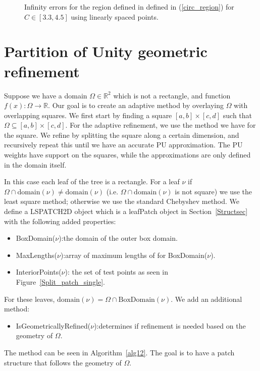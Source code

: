 \documentclass{article}
\newcommand{\R}{\mathbb{R}}
\begin{document}
\begin{figure}[!htb]
\centering
{}\hfill
{}
\label{circplotl}
\caption{Infinity errors for the region defined in  defined in (\ref{circ_region}) for $C \in [3.3,4.5]$ using linearly spaced points.}
\end{figure}

\section{Partition of Unity geometric refinement}

Suppose we have a domain $\Omega \in \R^2$ which is not a rectangle, and function $f(x):\Omega \to \R$. Our goal is to create an adaptive method by overlaying $\Omega$ with overlapping squares. We first start by finding a square $[a,b] \times [c,d]$ such that $\Omega \subseteq [a,b] \times [c,d]$. For the adaptive refinement, we use the method we have for the square. We refine by splitting the square along a certain dimension, and recursively repeat this until we have an accurate PU approximation. The PU weights have support on the squares, while the approximations are only defined in the domain itself.

In this case each leaf of the tree is a rectangle. For a leaf $\nu$ if $\Omega \cap \text{domain}(\nu) \neq \text{domain}(\nu)$ (i.e. $\Omega \cap \text{domain}(\nu)$ is not square) we use the least square method; otherwise we use the standard Chebyshev method. We define a LSPATCH2D object which is a leafPatch object in Section~\ref{Structsec} with the following added properties:
\begin{itemize}
\item BoxDomain($\nu$):the domain of the outer box domain.
\item MaxLengths($\nu$):array of maximum lengths of for BoxDomain($\nu$).
\item InteriorPoints($\nu$): the set of test points as seen in Figure~\ref{Split_patch_single}.

\end{itemize}
For these leaves, $\text{domain}(\nu) = \Omega \cap \text{BoxDomain}(\nu)$. We add an additional method:
\begin{itemize}
\item IsGeometricallyRefined($\nu$):determines if refinement is needed based on the geometry of $\Omega$.
\end{itemize}
The method can be seen in Algorithm~\ref{alg12}. The goal is to have a patch structure that follows the geometry of $\Omega$.
\end{document}
